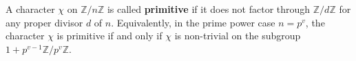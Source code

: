 A character $\chi$ on $\mathbb{Z}/n\mathbb{Z}$ is called \textbf{primitive} if it does not factor through $\mathbb{Z}/d\mathbb{Z}$ for any proper divisor $d$ of $n$. Equivalently, in the prime power case $n = p^v$, the character $\chi$ is primitive if and only if $\chi$ is non-trivial on the subgroup $1 + p^{v-1}\mathbb{Z}/p^v\mathbb{Z}$.
